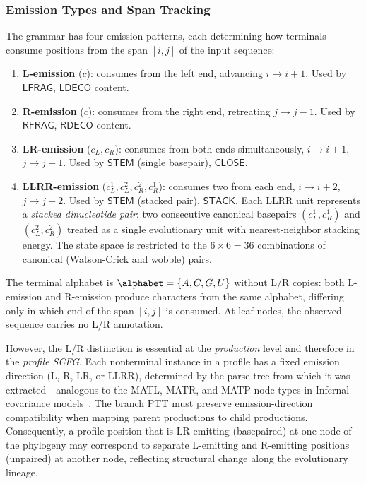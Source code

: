 \subsubsection{Emission Types and Span Tracking}
\label{sec:emission-types}

The grammar has four emission patterns, each determining how
terminals consume positions from the span $[i,j]$ of the
input sequence:

\begin{enumerate}
\item \textbf{L-emission} ($c$):
  consumes from the left end, advancing $i \to i+1$.
  Used by $\mathsf{LFRAG}$, $\mathsf{LDECO}$ content.

\item \textbf{R-emission} ($c$):
  consumes from the right end, retreating $j \to j-1$.
  Used by $\mathsf{RFRAG}$, $\mathsf{RDECO}$ content.

\item \textbf{LR-emission} ($c_L, c_R$):
  consumes from both ends simultaneously, $i \to i+1$, $j \to j-1$.
  Used by $\mathsf{STEM}$ (single basepair), $\mathsf{CLOSE}$.

\item \textbf{LLRR-emission} ($c_L^1, c_L^2, c_R^2, c_R^1$):
  consumes two from each end, $i \to i+2$, $j \to j-2$.
  Used by $\mathsf{STEM}$ (stacked pair), $\mathsf{STACK}$.
  Each LLRR unit represents a \emph{stacked dinucleotide pair}:
  two consecutive canonical basepairs $(c_L^1, c_R^1)$ and $(c_L^2, c_R^2)$
  treated as a single evolutionary unit with
  nearest-neighbor stacking energy.
  The state space is restricted to the $6 \times 6 = 36$
  combinations of canonical (Watson-Crick and wobble) pairs.
\end{enumerate}

\begin{remark}
\label{rem:lr-distinction}
The terminal alphabet is $\alphabet = \{A,C,G,U\}$ without
L/R copies: both L-emission and R-emission produce characters
from the same alphabet, differing only in which end of the
span $[i,j]$ is consumed.
At leaf nodes, the observed sequence carries no L/R annotation.

However, the L/R distinction is essential at the \emph{production}
level and therefore in the \emph{profile SCFG}.
Each nonterminal instance in a profile has a fixed emission
direction (L, R, LR, or LLRR), determined by the parse tree
from which it was extracted---analogous to the MATL, MATR,
and MATP node types in Infernal covariance models~\cite{Nawrocki2009}.
The branch PTT must preserve emission-direction compatibility
when mapping parent productions to child productions.
Consequently, a profile position that is LR-emitting (basepaired)
at one node of the phylogeny may correspond to separate
L-emitting and R-emitting positions (unpaired) at another node,
reflecting structural change along the evolutionary lineage.
\end{remark}

